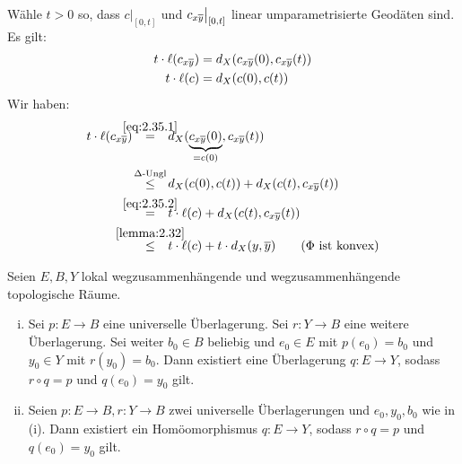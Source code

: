 \vspace{1em}

\begin{beweis}
	Wähle $t > 0$ so, dass $c\big|_{[0,t]}$ und $c_{x \overline{y}} \big|_{[0,t]}$ linear umparametrisierte Geodäten sind.
	Es gilt:
	\begin{align}
		t \cdot \ell(c_{x \overline{y}}) &= d_X(c_{x \overline{y}}(0),c_{x \overline{y}}(t)) \label{eq:2.35.1} \\
		t \cdot \ell(c) &= d_X(c(0),c(t)) \label{eq:2.35.2}
	\end{align}
	Wir haben:
	\begin{align*}
		t \cdot \ell(c_{x \ol{y}}) &\stack{\eqref{eq:2.35.1}}{=} d_X(\Underbrace{c_{x \ol{y}}(0)}{=c(0)},c_{x \ol{y}}(t)) \\
		&\stack{\Delta\text{-Ungl}}{\leq} d_X(c(0),c(t)) + d_X(c(t),c_{x \ol{y}}(t)) \\
		&\stack{\eqref{eq:2.35.2}}{=} t \cdot \ell(c) + d_X(c(t),c_{x \ol{y}}(t)) \\
		&\stack{\ref{lemma:2.32}}{\leq} t \cdot \ell(c) + t \cdot d_X(y,\ol{y}) \qquad (\Phi \text{ ist konvex}) 
	\end{align*}
\end{beweis}

\begin{bemerkung}
\label{bem:2.36}
	Seien $E,B,Y$ lokal wegzusammenhängende und wegzusammenhängende topologische Räume.
	\begin{enumerate}[(i)]
		\item Sei $p \colon E \rightarrow B$ eine universelle Überlagerung.
		Sei $r \colon Y \rightarrow B$ eine weitere Überlagerung.
		Sei weiter $b_0 \in B$ beliebig und $e_0 \in E$ mit $p(e_0) = b_0$ und $y_0 \in Y$ mit $r(y_0) = b_0$.
		Dann existiert eine Überlagerung $q \colon E \rightarrow Y$, sodass $r \circ q = p$ und $q(e_0) = y_0$ gilt.
		\item Seien $p\colon E \rightarrow B, r\colon Y \rightarrow B$ zwei universelle Überlagerungen und $e_0,y_0,b_0$ wie in (i).
		Dann existiert ein Homöomorphismus $q \colon E \rightarrow Y$, sodass $r \circ q = p$ und $q(e_0) = y_0$ gilt.
	\end{enumerate}
\end{bemerkung}

